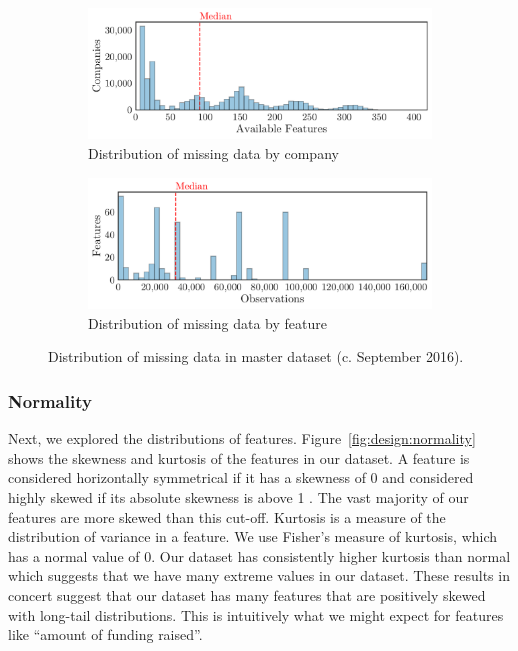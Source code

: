 \documentclass[../thesis/thesis.tex]{subfiles}
\begin{document}
\begin{figure}[!htb]
    \centering
    \begin{subfigure}{\textwidth}
        \includegraphics[width=\textwidth]{../figures/design/sparsity_features}
        \caption[Sparsity by company]{Distribution of missing data by company}
        \label{fig:design:sparsity:features}
    \end{subfigure}
    \begin{subfigure}{\textwidth}
        \includegraphics[width=\textwidth]{../figures/design/sparsity_observations}
        \caption[Sparsity by feature]{Distribution of missing data by feature}
        \label{fig:design:sparsity:observations}
    \end{subfigure}
    \caption[Distribution of missing data]{Distribution of missing data in master dataset (c. September 2016).}
    \label{fig:design:sparsity}
\end{figure}

\subsubsection{Normality} %

Next, we explored the distributions of features. Figure~\ref{fig:design:normality} shows the skewness and kurtosis of the features in our dataset. A feature is considered horizontally symmetrical if it has a skewness of 0 and considered highly skewed if its absolute skewness is above 1 \cite{bulmer1979}. The vast majority of our features are more skewed than this cut-off. Kurtosis is a measure of the distribution of variance in a feature. We use Fisher's measure of kurtosis, which has a normal value of 0. Our dataset has consistently higher kurtosis than normal which suggests that we have many extreme values in our dataset. These results in concert suggest that our dataset has many features that are positively skewed with long-tail distributions. This is intuitively what we might expect for features like ``amount of funding raised''.
\end{document}

